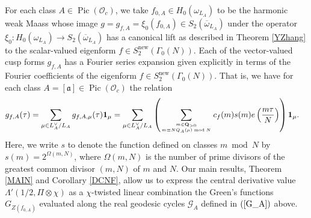 \documentclass{amsart}
\theoremstyle{definition}
\begin{document}
For each class $A \in \operatorname{Pic}(\mathcal{O}_c)$, we take $f_{0, A} \in H_{0}(\omega_{L_A})$ to be the harmonic weak Maass 
whose image $g = g_{f, A} = \xi_0(f_{0, A}) \in S_{2}(\overline{\omega}_{L_A})$ 
under the operator $\xi_0 : H_{0}(\omega_{L_A}) \rightarrow S_{2}(\overline{\omega}_{L_A})$ 
has a canonical lift as described in Theorem \ref{YZhang} to the scalar-valued eigenform $f \in S_2^{\operatorname{new}}(\Gamma_0(N))$. 
Each of the vector-valued cusp forms  $g_{f, A}$ has a Fourier series expansion given explicitly in terms of the 
Fourier coefficients of the eigenform $f \in S_2^{\operatorname{new}}(\Gamma_0(N))$. 
That is, we have for each class $A = [\mathfrak{a}] \in \operatorname{Pic}(\mathcal{O}_c)$ the relation 
\begin{align*} g_{f, A}(\tau) &= \sum\limits_{\mu \in L_A^{\vee}/L_A} g_{f, A, \mu}(\tau) {\bf{1}}_{\mu}
= \sum\limits_{\mu \in L_A^{\vee}/ L_A} \left( \sum\limits_{m \in {\bf{Q}}_{>0} \atop m \equiv N Q_A(\mu) \bmod N} 
c_f(m) s(m) e \left( \frac{m \tau}{N} \right) \right) {\bf{1}}_{\mu}. \end{align*}
Here, we write $s$ to denote the function defined on classes $m \bmod N$ by $s(m) = 2^{\Omega(m, N)}$, 
where $\Omega(m, N)$ is the number of prime divisors of the greatest common divisor $(m, N)$ of $m$ and $N$. 
Our main results, Theorem \ref{MAIN} and Corollary \ref{DCNF}, 
allow us to express the central derivative value $\Lambda'(1/2, \Pi \otimes \chi)$ as a $\chi$-twisted linear combination 
the Green's functions $G_{Z(f_{0, A})}$ evaluated along the real geodesic cycles $\mathcal{G}_A$ defined in $(\ref{G_A})$ above.
\end{document}
